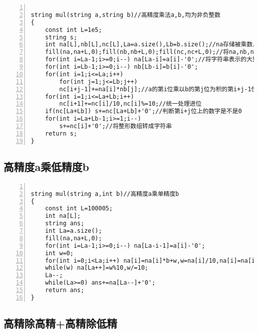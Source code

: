 \begin{lstlisting}[language={[ANSI]C},numbers=left]

string mul(string a,string b)//高精度乘法a,b,均为非负整数
{
    const int L=1e5;
    string s;
    int na[L],nb[L],nc[L],La=a.size(),Lb=b.size();//na存储被乘数，nb存储乘数，nc存储积
    fill(na,na+L,0);fill(nb,nb+L,0);fill(nc,nc+L,0);//将na,nb,nc都置为0
    for(int i=La-1;i>=0;i--) na[La-i]=a[i]-'0';//将字符串表示的大整形数转成i整形数组表示的大整形数
    for(int i=Lb-1;i>=0;i--) nb[Lb-i]=b[i]-'0';
    for(int i=1;i<=La;i++)
        for(int j=1;j<=Lb;j++)
        nc[i+j-1]+=na[i]*nb[j];//a的第i位乘以b的第j位为积的第i+j-1位（先不考虑进位）
    for(int i=1;i<=La+Lb;i++)
        nc[i+1]+=nc[i]/10,nc[i]%=10;//统一处理进位
    if(nc[La+Lb]) s+=nc[La+Lb]+'0';//判断第i+j位上的数字是不是0
    for(int i=La+Lb-1;i>=1;i--)
        s+=nc[i]+'0';//将整形数组转成字符串
    return s;
}
\end{lstlisting}

\subsection{高精度a乘低精度b}


\begin{lstlisting}[language={[ANSI]C},numbers=left]

string mul(string a,int b)//高精度a乘单精度b
{
    const int L=100005;
    int na[L];
    string ans;
    int La=a.size();
    fill(na,na+L,0);
    for(int i=La-1;i>=0;i--) na[La-i-1]=a[i]-'0';
    int w=0;
    for(int i=0;i<La;i++) na[i]=na[i]*b+w,w=na[i]/10,na[i]=na[i]%10;
    while(w) na[La++]=w%10,w/=10;
    La--;
    while(La>=0) ans+=na[La--]+'0';
    return ans;
}
\end{lstlisting}

\subsection{高精除高精+高精除低精}


